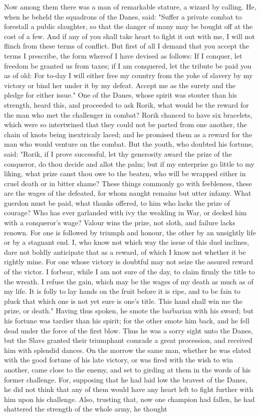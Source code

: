 \documentclass[10pt,a4paper]{report}
\begin{document}
Now among them there was a man of remarkable stature, a wizard by calling. He, when he beheld the squadrons of the Danes, said: "Suffer a private combat to forestall a public slaughter, so that the danger of many may be bought off at the cost of a few. And if any of you shall take heart to fight it out with me, I will not flinch from these terms of conflict. But first of all I demand that you accept the terms I prescribe, the form whereof I have devised as follows: If I conquer, let freedom be granted us from taxes; if I am conquered, let the tribute be paid you as of old: For to-day I will either free my country from the yoke of slavery by my victory or bind her under it by my defeat. Accept me as the surety and the pledge for either issue." One of the Danes, whose spirit was stouter than his strength, heard this, and proceeded to ask Rorik, what would be the reward for the man who met the challenger in combat? Rorik chanced to have six bracelets, which were so intertwined that they could not be parted from one another, the chain of knots being inextricaly laced; and he promised them as a reward for the man who would venture on the combat. But the youth, who doubted his fortune, said: "Rorik, if I prove successful, let thy generosity award the prize of the conqueror, do thou decide and allot the palm; but if my enterprise go little to my liking, what prize canst thou owe to the beaten, who will be wrapped either in cruel death or in bitter shame? These things commonly go with feebleness, these are the wages of the defeated, for whom naught remains but utter infamy. What guerdon must be paid, what thanks offered, to him who lacks the prize of courage? Who has ever garlanded with ivy the weakling in War, or decked him with a conqueror's wage? Valour wins the prize, not sloth, and failure lacks renown. For one is followed by triumph and honour, the other by an unsightly life or by a stagnant end. I, who know not which way the issue of this duel inclines, dare not boldly anticipate that as a reward, of which I know not whether it be rightly mine. For one whose victory is doubtful may not seize the assured reward of the victor. I forbear, while I am not sure of the day, to claim firmly the title to the wreath. I refuse the gain, which may be the wages of my death as much as of my life. It is folly to lay hands on the fruit before it is ripe, and to be fain to pluck that which one is not yet sure is one's title. This hand shall win me the prize, or death." Having thus spoken, he smote the barbarian with his sword; but his fortune was tardier than his spirit; for the other smote him back, and he fell dead under the force of the first blow. Thus he was a sorry sight unto the Danes, but the Slavs granted their triumphant comrade a great procession, and received him with splendid dances. On the morrow the same man, whether he was elated with the good fortune of his late victory, or was fired with the wish to win another, came close to the enemy, and set to girding at them in the words of his former challenge. For, supposing that he had laid low the bravest of the Danes, he did not think that any of them would have any heart left to fight further with him upon his challenge. Also, trusting that, now one champion had fallen, he had shattered the strength of the whole army, he thought 
\end{document}
